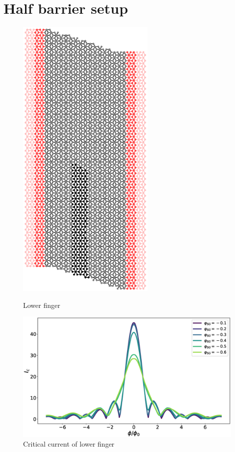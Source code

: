 \documentclass[a4paper]{article}
\begin{document}
\section{Half barrier setup}
\begin{figure}[h!]
\centering
\begin{minipage}{0.3\textwidth}
\centering
\includegraphics[width=0.6\textwidth]{hb_lower}
\caption{Lower finger}
\end{minipage}%
\begin{minipage}{0.7\textwidth}
\centering
\includegraphics[width=\textwidth]{hb_lower_plot}
\caption{Critical current of lower finger}
\end{minipage}
\end{figure}
\end{document}
